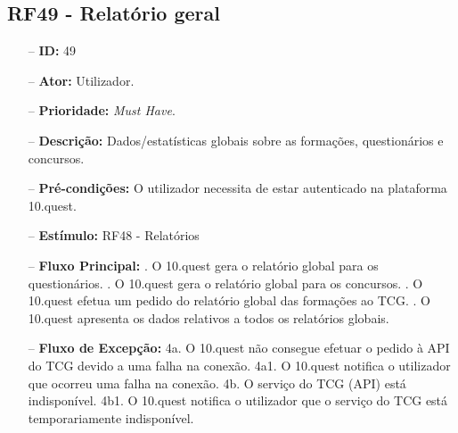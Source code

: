 \subsection{RF49 - Relatório geral}
\begin{itemize}
	\item[--] \textbf{ID:} 49
	\item[--]  \textbf{Ator:} Utilizador.
	\item[--]  \textbf{Prioridade:} \textit{Must Have}.
	\item[--]  \textbf{Descrição:} Dados/estatísticas globais sobre as formações, questionários e concursos.
	\item[--]  \textbf{Pré-condições:} O utilizador necessita de estar autenticado na plataforma 10.quest.
	\item[--]  \textbf{Estímulo:} RF48 - Relatórios
	\item[--]  \textbf{Fluxo Principal:} 
	. O 10.quest gera o relatório global para os questionários.
	. O 10.quest gera o relatório global para os concursos.
	. O 10.quest efetua um pedido do relatório global das formações ao TCG.
	. O 10.quest apresenta os dados relativos a todos os relatórios globais.
	\item[--]  \textbf{Fluxo de Excepção:} 
	\subitem 4a. O 10.quest não consegue efetuar o pedido à API do TCG devido a uma falha na conexão.
	\subitem 4a1. O 10.quest notifica o utilizador que ocorreu uma falha na conexão.
	\subitem 4b. O serviço do TCG (API) está indisponível.
	\subitem 4b1. O 10.quest notifica o utilizador que o serviço do TCG está temporariamente indisponível. 
\end{itemize}
\newpage

